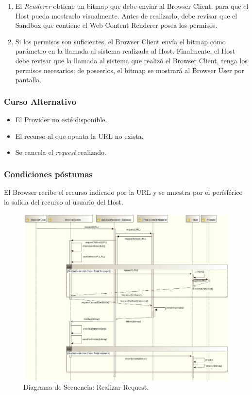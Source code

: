 \begin{enumerate}
		\item El \textit{Renderer} obtiene un bitmap que debe enviar al Browser Client, para que el Host pueda mostrarlo visualmente. Antes de realizarlo, debe revisar que el Sandbox que contiene el Web Content Renderer posea los permisos.
		\item Si los permisos son suficientes, el Browser Client envía el bitmap como parámetro en la llamada al sistema realizada al Host. Finalmente, el Host debe revisar que la llamada al sistema que realizó el Browser Client, tenga los permisos necesarios; de poseerlos, el bitmap se mostrará al Browser User por pantalla.
	\end{enumerate}
\subsubsection{Curso Alternativo} 
\begin{itemize}
\item El Provider no esté disponible.
\item El recurso al que apunta la URL no exista.
\item Se cancela el \textit{request} realizado.
	\end{itemize}
\subsubsection{Condiciones póstumas} El Browser recibe el recurso indicado por la URL y se muestra por el perísférico la salida del recurso al usuario del Host.
	\begin{landscape}
	    \begin{figure}[h!t]
	        \centering
	        \includegraphics[scale=0.61]{figures/chap4/requestResource_v2.jpg}
	        \caption{Diagrama de Secuencia: Realizar Request.}
	        \label{fig:SecReq}
	    \end{figure}
	\end{landscape}
